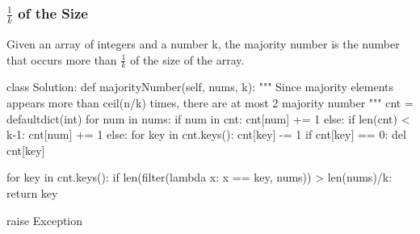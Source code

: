 \subsubsection{$\frac{1}{k}$ of the Size}
Given an array of integers and a number k, the majority number is the number that occurs more than $\frac{1}{k}$ of the size of
the array.
\begin{python}
class Solution:
    def majorityNumber(self, nums, k):
        """
        Since majority elements appears more than ceil(n/k) times, 
        there are at most 2 majority number
        """
        cnt = defaultdict(int)
        for num in nums:
            if num in cnt:
                cnt[num] += 1
            else:
                if len(cnt) < k-1:
                    cnt[num] += 1
                else:
                    for key in cnt.keys():
                        cnt[key] -= 1
                        if cnt[key] == 0:
                            del cnt[key]

        for key in cnt.keys():
            if len(filter(lambda x: x == key, nums)) > len(nums)/k:
                return key

        raise Exception
\end{python}

